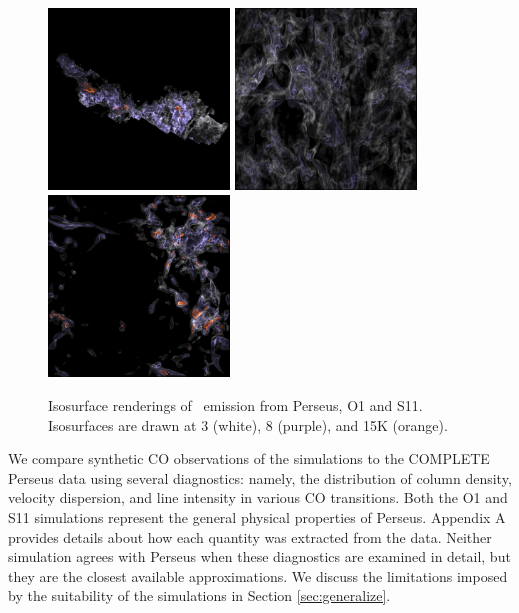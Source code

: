 \begin{figure}[htbp]
\centering
\includegraphics[width=1.9in]{figures/per_vol}
\includegraphics[width=1.9in]{figures/stella_vol}
\includegraphics[width=1.9in]{figures/rahul_vol}
\caption{Isosurface renderings of \coa\, emission from Perseus, O1 and S11. Isosurfaces are drawn at 3 (white), 8 (purple), and 15K (orange).}
\label{fig:volume}
\end{figure}

We compare synthetic CO observations of the simulations to the COMPLETE Perseus data \citep{http://adsabs.harvard.edu/abs/2006AJ....131.2921R} using several
diagnostics: namely, the distribution of column density, velocity dispersion, and line intensity in various CO transitions.
Both the O1 and S11 simulations represent the general physical properties of Perseus. Appendix A provides details about how each
quantity was extracted from the data. Neither simulation
agrees with Perseus when these diagnostics are examined in detail, but they are the closest available approximations. We discuss the limitations imposed by the suitability of the simulations in Section \ref{sec:generalize}.

